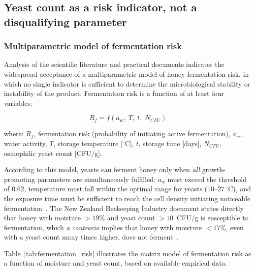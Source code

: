 \subsection{Yeast count as a risk indicator, not a disqualifying parameter}

\subsubsection{Multiparametric model of fermentation risk}

Analysis of the scientific literature and practical documents
indicates the widespread acceptance of a multiparametric model
of honey fermentation risk, in which no single indicator is
sufficient to determine the microbiological stability or
instability of the product. Fermentation risk is a function
of at least four variables:

\begin{equation}
R_f = f\!\left(a_w,\; T,\; t,\; N_{CFU}\right)
\label{eq:fermentation_risk}
\end{equation}

\noindent where: $R_f$, fermentation risk (probability of initiating
active fermentation), $a_w$, water activity, $T$, storage
temperature [$^\circ$C], $t$, storage time [days],
$N_{CFU}$, osmophilic yeast count [CFU/g].

According to this model, yeasts can ferment honey only when
\emph{all} growth-promoting parameters are simultaneously fulfilled:
$a_w$ must exceed the threshold of $0.62$, temperature must fall
within the optimal range for yeasts ($10$--$27\,^\circ$C),
and the exposure time must be sufficient to reach the cell density
initiating noticeable fermentation~\cite{apinz2021}.
The New Zealand Beekeeping Industry document states directly that
honey with moisture $> 19\%$ and yeast count $> 10$~CFU/g is
susceptible to fermentation, which \emph{a contrario} implies
that honey with moisture $< 17\%$, even with a yeast count many
times higher, does not ferment~\cite{apinz2021}.

Table~\ref{tab:fermentation_risk} illustrates the matrix model
of fermentation risk as a function of moisture and yeast count,
based on available empirical data.

